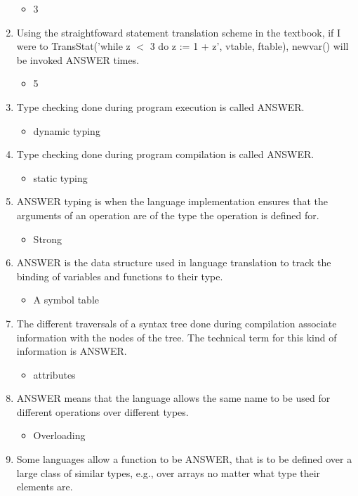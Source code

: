 \documentclass{exam}
\begin{document}
\begin{enumerate}
\begin{itemize}
\item 3
\end{itemize}
\item Using the straightfoward statement translation scheme in the textbook, if I were to TransStat('while z $<$ 3 do z := 1 + z', vtable, ftable), newvar() will be invoked ANSWER times.
\begin{itemize}
\item 5
\end{itemize}
\item Type checking done during program execution is called ANSWER.
\begin{itemize}
\item dynamic typing
\end{itemize}
\item Type checking done during program compilation is called ANSWER.
\begin{itemize}
\item static typing
\end{itemize}
\item ANSWER typing is when the language implementation ensures that the arguments of an operation are of the type the operation is defined for.
\begin{itemize}
\item Strong
\end{itemize}
\item ANSWER is the data structure used in language translation to track the binding of variables and functions to their type.
\begin{itemize}
\item A symbol table
\end{itemize}
\item The different traversals of a syntax tree done during compilation associate information with the nodes of the tree.  The technical term for this kind of information is ANSWER.
\begin{itemize}
\item attributes
\end{itemize}
\item ANSWER means that the language allows the same name to be used for different operations over different types.
\begin{itemize}
\item Overloading
\end{itemize}
\item Some languages allow a function to be ANSWER, that is to be defined over a large class of similar types, e.g., over arrays no matter what type their elements are.

\end{enumerate}
\end{document}
